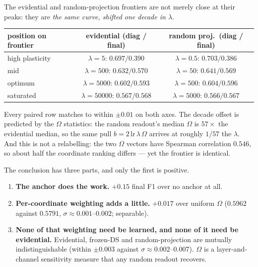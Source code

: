 \documentclass{article}
\begin{document}
The evidential and random-projection frontiers are not merely close at their
peaks: they are \emph{the same curve, shifted one decade in $\lambda$}.

\begin{center}
\begin{tabular}{lcc}
\toprule
position on frontier & evidential (diag / final) & random proj.\ (diag / final) \\
\midrule
high plasticity & $\lambda{=}5$: $0.697 / 0.390$ & $\lambda{=}0.5$: $0.703 / 0.386$ \\
mid             & $\lambda{=}500$: $0.632 / 0.570$ & $\lambda{=}50$: $0.641 / 0.569$ \\
optimum         & $\lambda{=}5000$: $0.602 / 0.593$ & $\lambda{=}500$: $0.604 / 0.596$ \\
saturated       & $\lambda{=}50000$: $0.567 / 0.568$ & $\lambda{=}5000$: $0.566 / 0.567$ \\
\bottomrule
\end{tabular}
\end{center}

Every paired row matches to within $\pm0.01$ on both axes. The decade offset is
predicted by the $\Omega$ statistics: the random readout's median $\Omega$ is
$57\times$ the evidential median, so the same pull $b = 2\,\mathrm{lr}\,\lambda\,\Omega$
arrives at roughly $1/57$ the $\lambda$. And this is not a relabelling: the two
$\Omega$ vectors have Spearman correlation $0.546$, so about half the coordinate
ranking differs --- yet the frontier is identical.

The conclusion has three parts, and only the first is positive.

\begin{enumerate}
  \item \textbf{The anchor does the work.} $+0.15$ final F1 over no anchor at all.
  \item \textbf{Per-coordinate weighting adds a little.} $+0.017$ over uniform
        $\Omega$ ($0.5962$ against $0.5791$, $\sigma \approx 0.001$--$0.002$;
        separable).
  \item \textbf{None of that weighting need be learned, and none of it need be
        evidential.} Evidential, frozen-DS and random-projection are mutually
        indistinguishable (within $\pm0.003$ against $\sigma \approx
        0.002$--$0.007$). $\Omega$ is a layer-and-channel sensitivity measure that
        any random readout recovers.
\end{enumerate}
\end{document}

